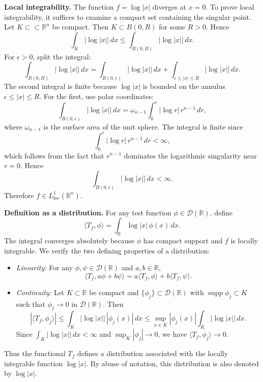 \begin{solution}

\textbf{Local integrability.}
The function $f=\log|x|$ diverges at $x=0$. To prove local integrability, it suffices to examine a compact set containing the singular point. Let $K\subset\subset\mathbb{R}^n$ be compact. Then $K\subset B(0,R)$ for some $R>0$. Hence
\[
\int_K |\log|x||\, dx \le \int_{B(0,R)} |\log|x||\, dx.
\]
For $\epsilon>0$, split the integral:
\[
\int_{B(0,R)} |\log|x||\, dx
=
\int_{B(0,\epsilon)} |\log|x||\, dx
+
\int_{\epsilon\le |x|\le R} |\log|x||\, dx.
\]
The second integral is finite because $\log|x|$ is bounded on the annulus $\epsilon\le |x|\le R$. For the first, use polar coordinates:
\[
\int_{B(0,\epsilon)} |\log|x||\, dx
=
\omega_{n-1} \int_0^\epsilon |\log r|\, r^{n-1}\, dr,
\]
where $\omega_{n-1}$ is the surface area of the unit sphere. The integral is finite since
\[
\int_0^\varepsilon |\log r|\,r^{n-1}\,dr<\infty,
\]
which follows from the fact that \(r^{n-1}\) dominates the logarithmic singularity near \(r=0\). Hence
\[
\int_{B(0,\epsilon)} |\log|x||\, dx < \infty.
\]
Therefore $f\in L^1_{\text{loc}}(\mathbb{R}^n)$.

\textbf{Definition as a distribution.}
For any test function $\phi\in\mathcal{D}(\mathbb{R})$, define
\[
\langle T_f,\phi\rangle = \int_{\mathbb{R}} \log|x|\, \phi(x)\, dx.
\]
The integral converges absolutely because $\phi$ has compact support and $f$ is locally integrable. We verify the two defining properties of a distribution:

\begin{itemize}
    \item \textit{Linearity:} For any $\phi,\psi\in\mathcal{D}(\mathbb{R})$ and $a,b\in\mathbb{R}$,
    \[
    \langle T_f, a\phi+b\psi\rangle
    =
    a\langle T_f,\phi\rangle + b\langle T_f,\psi\rangle.
    \]

    \item \textit{Continuity:} Let $K\subset\mathbb{R}$ be compact and $\{\phi_j\}\subset\mathcal{D}(\mathbb{R})$ with $\operatorname{supp}\phi_j\subset K$ such that $\phi_j\to0$ in $\mathcal{D}(\mathbb{R})$. Then
    \[
    |\langle T_f,\phi_j\rangle|
    \le
    \int_K |\log|x||\, |\phi_j(x)|\, dx
    \le
    \sup_{x\in K} |\phi_j(x)| \int_K |\log|x||\, dx.
    \]
    Since $\int_K |\log|x||\, dx < \infty$ and $\sup_K |\phi_j|\to 0$, we have $\langle T_f,\phi_j\rangle\to0$.
\end{itemize}

Thus the functional \(T_f\) defines a distribution associated with the locally integrable function \(\log|x|\). By abuse of notation, this distribution is also denoted by \(\log|x|\).


\end{solution}
